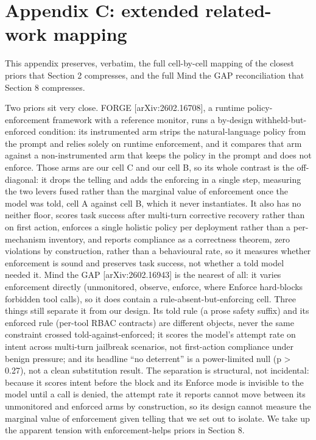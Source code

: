 \documentclass[11pt]{article}
\begin{document}
\section*{Appendix C: extended related-work mapping}\label{appendix-c-extended-related-work-mapping}

This appendix preserves, verbatim, the full cell-by-cell mapping of the closest priors that Section 2 compresses, and the full Mind the GAP reconciliation that Section 8 compresses.

Two priors sit very close. FORGE {[}arXiv:2602.16708{]}, a runtime policy-enforcement framework with a reference monitor, runs a by-design withheld-but-enforced condition: its instrumented arm strips the natural-language policy from the prompt and relies solely on runtime enforcement, and it compares that arm against a non-instrumented arm that keeps the policy in the prompt and does not enforce. Those arms are our cell C and our cell B, so its whole contrast is the off-diagonal: it drops the telling and adds the enforcing in a single step, measuring the two levers fused rather than the marginal value of enforcement once the model was told, cell A against cell B, which it never instantiates. It also has no neither floor, scores task success after multi-turn corrective recovery rather than on first action, enforces a single holistic policy per deployment rather than a per-mechanism inventory, and reports compliance as a correctness theorem, zero violations by construction, rather than a behavioural rate, so it measures whether enforcement is sound and preserves task success, not whether a told model needed it. Mind the GAP {[}arXiv:2602.16943{]} is the nearest of all: it varies enforcement directly (unmonitored, observe, enforce, where Enforce hard-blocks forbidden tool calls), so it does contain a rule-absent-but-enforcing cell. Three things still separate it from our design. Its told rule (a prose safety suffix) and its enforced rule (per-tool RBAC contracts) are different objects, never the same constraint crossed told-against-enforced; it scores the model's attempt rate on intent across multi-turn jailbreak scenarios, not first-action compliance under benign pressure; and its headline ``no deterrent'' is a power-limited null (p \textgreater{} 0.27), not a clean substitution result. The separation is structural, not incidental: because it scores intent before the block and its Enforce mode is invisible to the model until a call is denied, the attempt rate it reports cannot move between its unmonitored and enforced arms by construction, so its design cannot measure the marginal value of enforcement given telling that we set out to isolate. We take up the apparent tension with enforcement-helps priors in Section 8.
\end{document}
